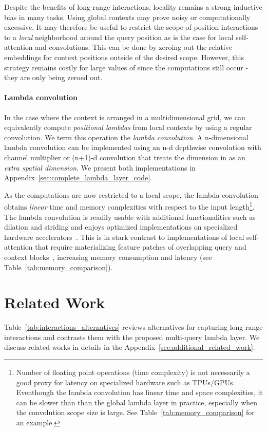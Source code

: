 \documentclass{article} \usepackage{iclr2021_conference,times}
\begin{document}
Despite the benefits of long-range interactions, locality remains a strong inductive bias in many tasks.
Using global contexts may prove noisy or computationally excessive.
It may therefore be useful to restrict the scope of position interactions to a \emph{local} neighborhood around the query position  as is the case for local self-attention and convolutions.
This can be done by zeroing out the relative embeddings for context positions  outside of the desired scope.
However, this strategy remains costly for large values of  since the computations still occur - they are only being zeroed out.

\vspace{-0.1cm}
\paragraph{Lambda convolution}
In the case where the context is arranged in a multidimensional grid, we can equivalently compute \emph{positional lambdas} from local contexts by using a regular convolution.
We term this operation the \emph{lambda convolution}.
A n-dimensional lambda convolution can be implemented using an n-d depthwise convolution with channel multiplier or (n+1)-d convolution that treats the  dimension in  as an \emph{extra spatial dimension}.
We present both implementations in Appendix~\ref{sec:complete_lambda_layer_code}.

As the computations are now restricted to a local scope, the lambda convolution obtains \emph{linear} time and memory complexities with respect to the input length\footnote{Number of floating point operations (time complexity) is not necessarily a good proxy for latency on specialized hardware such as TPUs/GPUs. Eventhough the lambda convolution has linear time and space complexities, it can be slower than than the global lambda layer in practice, especially when the convolution scope size is large. See Table~\ref{tab:memory_comparison} for an example.}.
The lambda convolution is readily usable with additional functionalities such as dilation and striding and enjoys optimized implementations on specialized hardware accelerators~\citep{nickolls2010gpu,jouppiTPU}.
This is in stark contrast to implementations of local self-attention that require materializing feature patches of overlapping query and context blocks~\citep{parmar2018image,ramachandran2019sasa}, increasing memory consumption and latency (see Table~\ref{tab:memory_comparison}). \section{Related Work\label{sec:related_work}}
Table~\ref{tab:interactions_alternatives} reviews alternatives for capturing long-range interactions and contrasts them with the proposed multi-query lambda layer.
We discuss related works in details in the Appendix~\ref{sec:additional_related_work}.
\end{document}
